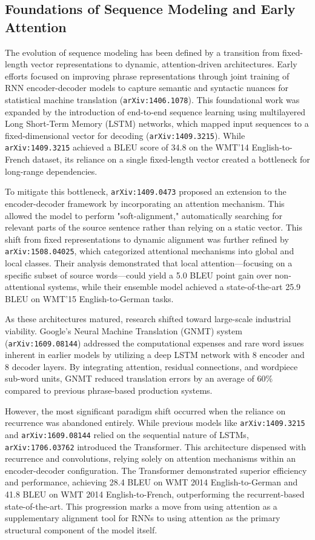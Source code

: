 \documentclass[11pt]{article}
\begin{document}
\subsection{Foundations of Sequence Modeling and Early Attention}

The evolution of sequence modeling has been defined by a transition from fixed-length vector representations to dynamic, attention-driven architectures. Early efforts focused on improving phrase representations through joint training of RNN encoder-decoder models to capture semantic and syntactic nuances for statistical machine translation (\texttt{arXiv:1406.1078}). This foundational work was expanded by the introduction of end-to-end sequence learning using multilayered Long Short-Term Memory (LSTM) networks, which mapped input sequences to a fixed-dimensional vector for decoding (\texttt{arXiv:1409.3215}). While \texttt{arXiv:1409.3215} achieved a BLEU score of 34.8 on the WMT'14 English-to-French dataset, its reliance on a single fixed-length vector created a bottleneck for long-range dependencies.

To mitigate this bottleneck, \texttt{arXiv:1409.0473} proposed an extension to the encoder-decoder framework by incorporating an attention mechanism. This allowed the model to perform "soft-alignment," automatically searching for relevant parts of the source sentence rather than relying on a static vector. This shift from fixed representations to dynamic alignment was further refined by \texttt{arXiv:1508.04025}, which categorized attentional mechanisms into global and local classes. Their analysis demonstrated that local attention—focusing on a specific subset of source words—could yield a 5.0 BLEU point gain over non-attentional systems, while their ensemble model achieved a state-of-the-art 25.9 BLEU on WMT'15 English-to-German tasks.

As these architectures matured, research shifted toward large-scale industrial viability. Google’s Neural Machine Translation (GNMT) system (\texttt{arXiv:1609.08144}) addressed the computational expenses and rare word issues inherent in earlier models by utilizing a deep LSTM network with 8 encoder and 8 decoder layers. By integrating attention, residual connections, and wordpiece sub-word units, GNMT reduced translation errors by an average of 60\% compared to previous phrase-based production systems.

However, the most significant paradigm shift occurred when the reliance on recurrence was abandoned entirely. While previous models like \texttt{arXiv:1409.3215} and \texttt{arXiv:1609.08144} relied on the sequential nature of LSTMs, \texttt{arXiv:1706.03762} introduced the Transformer. This architecture dispensed with recurrence and convolutions, relying solely on attention mechanisms within an encoder-decoder configuration. The Transformer demonstrated superior efficiency and performance, achieving 28.4 BLEU on WMT 2014 English-to-German and 41.8 BLEU on WMT 2014 English-to-French, outperforming the recurrent-based state-of-the-art. This progression marks a move from using attention as a supplementary alignment tool for RNNs to using attention as the primary structural component of the model itself.
\end{document}

